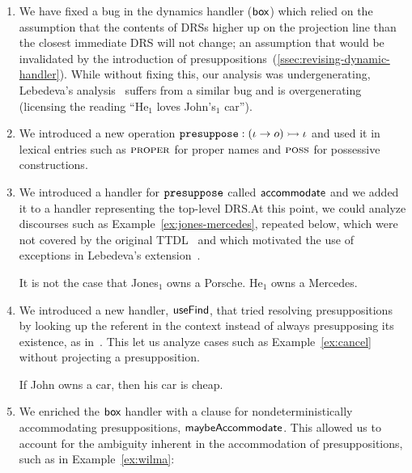 \begin{enumerate}
\item \label{item:fixbug} We have fixed a bug in the dynamics handler
  ($\textsf{box}$) which relied on the assumption that the contents of DRSs higher
  up on the projection line than the closest immediate DRS will not change;
  an assumption that would be invalidated by the introduction of
  presuppositions~(\ref{ssec:revising-dynamic-handler}). While without
  fixing this, our analysis was undergenerating, Lebedeva's
  analysis~\cite{lebedeva2012expression} suffers from a similar bug and is
  overgenerating (licensing the reading ``He$_1$ loves John's$_1$ car'').
  
\item \label{item:presuppose-op} We introduced a new operation
  $\mathtt{presuppose} : (\iota \to o) \rightarrowtail \iota$ and used it in lexical
  entries such as $\textsc{proper}$ for proper names and $\textsc{poss}$ for
  possessive constructions.

\item \label{item:accommodate-handler} We introduced a handler for
  $\mathtt{presuppose}$ called $\textsf{accommodate}$ and we added it to a handler
  representing the top-level DRS.\@ At this point, we could analyze
  discourses such as Example~\ref{ex:jones-mercedes}, repeated below, which
  were not covered by the original TTDL~\cite{de2006towards} and which
  motivated the use of exceptions in Lebedeva's
  extension~\cite{lebedeva2012expression}.

  \begin{exe}
     It is not the case that Jones$_1$ owns a
    Porsche. He$_1$ owns a Mercedes.
  \end{exe}

\item \label{item:maybe-accommodate} We introduced a new handler,
  $\textsf{useFind}$, that tried resolving presuppositions by looking up the
  referent in the context instead of always presupposing its existence, as
  in~\cite{lebedeva2012expression}. This let us analyze cases such as
  Example~\ref{ex:cancel} without projecting a presupposition.

  \begin{exe}
     If John owns a car, then his car is cheap.
  \end{exe}

\item \label{item:nondet-accommodation} We enriched the $\textsf{box}$ handler with
  a clause for nondeterministically accommodating presuppositions,
  $\textsf{maybeAccommodate}$. This allowed us to account for the ambiguity
  inherent in the accommodation of presuppositions, such as in
  Example~\ref{ex:wilma}:


\end{enumerate}
